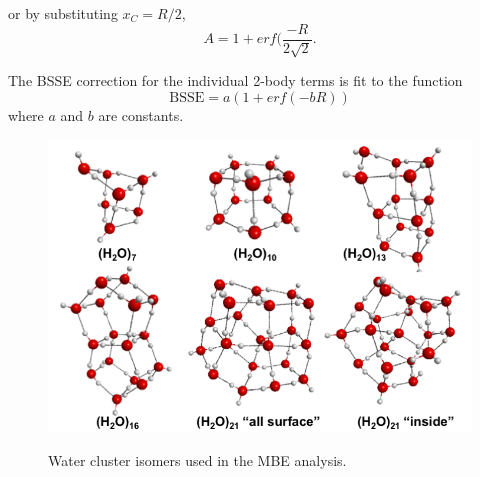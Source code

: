 \documentclass[11pt, proquest]{uwthesis}[2020/02/24]
\begin{document}
or by substituting $x_C=R/2$,
\begin{equation}\label{eq:MBE_I_1}
    A=1+erf(\frac{-R}{2\sqrt{2}}.
\end{equation}

The BSSE correction for the individual 2-body terms is fit to the function
\begin{equation}\label{eq:MBE_I_2}
    \mathrm{BSSE}=a(1+erf(-bR))
\end{equation}
where $a$ and $b$ are constants.

\begin{figure}[t]
\uwsinglespace
\centering
\includegraphics[width=\textwidth]{Figures/Chapter_2/cluster_structures.png}
\label{fig:MBE_I_F1}
\caption[Water cluster isomers used in the MBE analysis.]{Water cluster isomers used in the MBE analysis.}
\end{figure}
\end{document}
